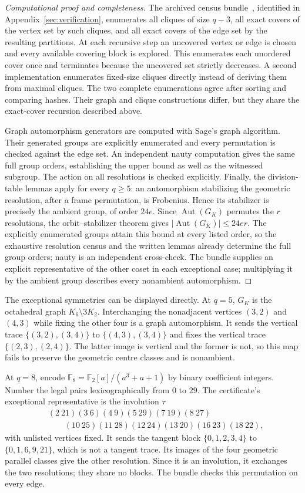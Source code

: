 \documentclass[11pt]{article}
\theoremstyle{definition}
\theoremstyle{remark}
\newcommand{\F}{\mathbb F}
\newcommand{\Aut}{\operatorname{Aut}}
\begin{document}
\begin{proof}[Computational proof and completeness]
The archived census bundle~\cite{CensusArtifact}, identified in
Appendix~\ref{sec:verification}, enumerates
all cliques of size $q-3$, all exact covers of the vertex set by such
cliques, and all exact covers of the edge set by the resulting partitions.
At each recursive step an uncovered vertex or edge is chosen and every
available covering block is explored. This enumerates each unordered
cover once and terminates because the uncovered set strictly decreases.
A second implementation enumerates fixed-size cliques directly instead
of deriving them from maximal cliques. The two complete enumerations
agree after sorting and comparing hashes. Their graph and clique constructions differ,
but they share the exact-cover recursion described above.

Graph automorphism generators are computed with Sage's graph algorithm.
Their generated groups are explicitly enumerated and every permutation
is checked against the edge set. An independent nauty computation gives
the same full group orders, establishing the upper bound as well as the
witnessed subgroup. The action on all resolutions is checked explicitly.
Finally, the division-table lemmas apply for every $q\ge5$: an automorphism
stabilizing the geometric resolution, after a frame permutation, is
Frobenius. Hence its stabilizer is precisely the ambient group, of
order $24e$. Since $\Aut(G_K)$ permutes the $r$ resolutions, the
orbit--stabilizer theorem gives $|\Aut(G_K)|\le24er$. The explicitly
enumerated groups attain this bound at every listed order, so the
exhaustive resolution census and the written lemmas already determine
the full group orders; nauty is an independent cross-check. The
bundle supplies an explicit representative of the other coset in each
exceptional case; multiplying it by the ambient group describes every
nonambient automorphism.
\end{proof}

The exceptional symmetries can be displayed directly. At $q=5$,
$G_K$ is the octahedral graph $K_6\setminus3K_2$. Interchanging the
nonadjacent vertices $(3,2)$ and $(4,3)$ while fixing the other four
is a graph automorphism. It sends the vertical trace
$\{(3,2),(3,4)\}$ to $\{(4,3),(3,4)\}$ and fixes the vertical trace
$\{(2,3),(2,4)\}$. The latter image is vertical and the former is not,
so this map fails to preserve the geometric centre classes and is nonambient.

At $q=8$, encode $\F_8=\F_2[a]/(a^3+a+1)$ by binary coefficient
integers. Number the legal pairs lexicographically from $0$ to $29$.
The certificate's exceptional representative is the involution $\tau$
\[
\begin{split}
 &(2\ 21)(3\ 6)(4\ 9)(5\ 29)(7\ 19)(8\ 27)\\
 &\qquad(10\ 25)(11\ 28)(12\ 24)(13\ 20)(16\ 23)(18\ 22),
\end{split}
\]
with unlisted vertices fixed. It sends the tangent block
$\{0,1,2,3,4\}$ to $\{0,1,6,9,21\}$, which is not a tangent trace.
Its images of the four geometric parallel classes give the other
resolution. Since it is an involution, it exchanges the two resolutions;
they share no blocks. The bundle checks this permutation on every edge.
\end{document}
